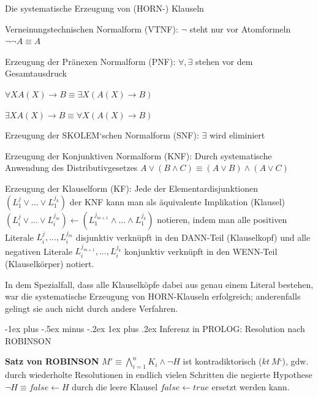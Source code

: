 \documentclass[a4paper]{article}
\makeatletter
\renewcommand{\note}[2]{\begin{noteBox} \textbf{#1} #2 \end{noteBox}}
\renewcommand{\subsubsection}{\@startsection{subsubsection}{3}{0mm}%
                {-1ex plus -.5ex minus -.2ex}%
                {1ex plus .2ex}%
                {\normalfont\small\bfseries}}
\makeatother
\begin{document}
\begin{multicols}{3}
  Die systematische Erzeugung von (HORN-) Klauseln
  \begin{enumerate*}
    \item Verneinungstechnischen Normalform (VTNF): $\lnot$ steht nur vor Atomformeln $\lnot\lnot A\equiv A$
    \item Erzeugung der Pränexen Normalform (PNF): $\forall, \exists$ stehen vor dem Gesamtausdruck
    \begin{itemize*}
      \item $\forall X A(X) \rightarrow B \equiv \exists X(A(X)\rightarrow B)$
      \item $\exists X A(X) \rightarrow B \equiv \forall X(A(X)\rightarrow B)$
    \end{itemize*}
    \item Erzeugung der SKOLEM‘schen Normalform (SNF): $\exists$ wird eliminiert
    \item Erzeugung der Konjunktiven Normalform (KNF): Durch systematische Anwendung des Distributivgesetzes $A\vee (B\wedge C)\equiv (A\vee B)\wedge(A\vee C)$
    \item Erzeugung der Klauselform (KF): Jede der Elementardisjunktionen $(L_1^j \vee...\vee L_1^{j_k})$ der KNF kann man als äquivalente Implikation (Klausel) $(L_i^j \vee...\vee L_i^{j_m})\leftarrow(L_1^{j_{m+1}}\wedge ...\wedge L_1^{j_k})$ notieren, indem man alle positiven Literale $L_i^j,...,L_i^{j_m}$ disjunktiv verknüpft in den DANN-Teil (Klauselkopf) und alle negativen Literale $L_i^{j_{m+1}},...,L_i^{j_k}$ konjunktiv verknüpft in den WENN-Teil (Klauselkörper) notiert.
    \item In dem Spezialfall, dass alle Klauselköpfe dabei aus genau einem Literal bestehen, war die systematische Erzeugung von HORN-Klauseln erfolgreich; anderenfalls gelingt sie auch nicht durch andere Verfahren.
  \end{enumerate*}

  \subsubsection{Inferenz in PROLOG: Resolution nach ROBINSON}
  \note{Satz von ROBINSON}{$M'\equiv\bigwedge_{i=1}^n K_i\wedge \lnot H$ ist kontradiktorisch ($kt\ M‘$), gdw. durch wiederholte Resolutionen in endlich vielen Schritten die negierte Hypothese $\lnot H\equiv false \leftarrow H$ durch die leere Klausel $false\leftarrow true$ ersetzt werden kann.}


\end{multicols}
\end{document}
